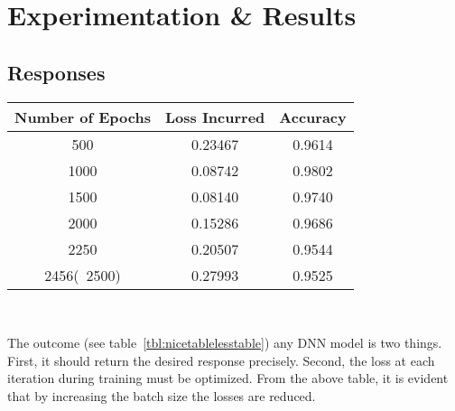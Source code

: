 
\chapter{Experimentation \& Results}


\section{Responses}


\begin{center}
    \begin{tabular}{ |c|c|c| } 
        \hline
        Number of Epochs & Loss Incurred & Accuracy \\ [0.5ex]
        \hline\hline
        500 & 0.23467 & 0.9614 \\
        1000 & 0.08742 & 0.9802 \\
        1500 & 0.08140 & 0.9740 \\
        2000 & 0.15286 & 0.9686 \\
        2250 & 0.20507 & 0.9544 \\
        2456(~2500) & 0.27993 & 0.9525 \\
        \hline
    \end{tabular}
    ~\label{tbl:nicetablelesstable}
\end{center}

The outcome (see table~\ref{tbl:nicetablelesstable}) any DNN model is two things. First, it should return the desired response precisely. Second, the loss at each iteration during training must be optimized. From the above table, it is evident that by increasing the batch size the losses are reduced.